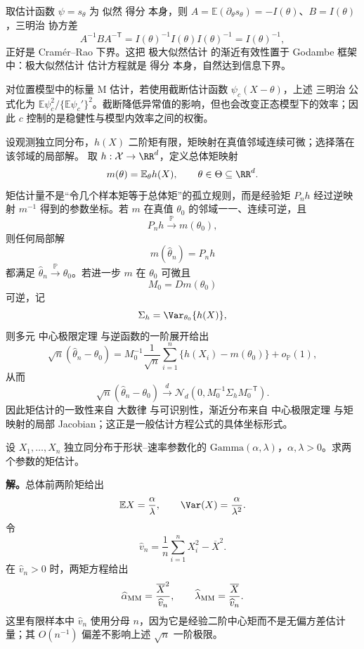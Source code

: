 取估计函数 $\psi=s_\theta$ 为 似然 得分 本身，则 $A=\mathbb E(\partial_\theta s_\theta)=-I(\theta)$、$B=I(\theta)$，三明治 协方差
\[
A^{-1}BA^{-\mathsf T}=I(\theta)^{-1}I(\theta)I(\theta)^{-1}=I(\theta)^{-1},
\]
正好是 Cramér--Rao 下界。这把 极大似然估计 的渐近有效性置于 Godambe 框架中：极大似然估计 估计方程就是 得分 本身，自然达到信息下界。


\begin{note}[截断估计函数的效率]
对位置模型中的标量 M 估计，若使用截断估计函数 $\psi_c(X-\theta)$，上述 三明治 公式化为 $\mathbb E\psi_c^2/\{\mathbb E\psi_c'\}^2$。截断降低异常值的影响，但也会改变正态模型下的效率；因此 $c$ 控制的是稳健性与模型内效率之间的权衡。
\end{note}

\begin{theorem}[矩映射的局部反演]
设观测独立同分布，$h(X)$ 二阶矩有限，矩映射在真值邻域连续可微；选择落在该邻域的局部解。
取 $h:\mathcal X\to\RR^d$，定义总体矩映射
\[
 m(\theta)=\mathbb E_\theta h(X),
 \qquad
 \theta\in\Theta\subseteq\RR^d.
\]
矩估计量不是“令几个样本矩等于总体矩”的孤立规则，而是经验矩 $P_nh$ 经过逆映射 $m^{-1}$ 得到的参数坐标。若 $m$ 在真值 $\theta_0$ 的邻域一一、连续可逆，且
\[
 P_nh\xrightarrow{\mathbb P} m(\theta_0),
\]
则任何局部解
\[
 m(\widehat\theta_n)=P_nh
\]
都满足 $\widehat\theta_n\xrightarrow{\mathbb P}\theta_0$。若进一步 $m$ 在 $\theta_0$ 可微且
\[
 M_0=Dm(\theta_0)
\]
可逆，记
\[
 \Sigma_h=\Var_{\theta_0}\{h(X)\},
\]
则多元 中心极限定理 与逆函数的一阶展开给出
\begin{equation}\label{eq:math-stat-moment-estimator-asymptotic}
 \sqrt n(\widehat\theta_n-\theta_0)
 =M_0^{-1}\frac1{\sqrt n}
 \sum_{i=1}^n\{h(X_i)-m(\theta_0)\}
 +o_{\mathbb P}(1),
\end{equation}
从而
\[
 \sqrt n(\widehat\theta_n-\theta_0)
 \xrightarrow{d}
 \mathcal N_d(0,M_0^{-1}\Sigma_hM_0^{-\mathsf T}).
\]
因此矩估计的一致性来自 大数律 与可识别性，渐近分布来自 中心极限定理 与矩映射的局部 Jacobian；这正是一般估计方程公式的具体坐标形式。
\end{theorem}

\begin{workedexample}
设 $X_1,\ldots,X_n$ 独立同分布于形状--速率参数化的 $\mathrm{Gamma}(\alpha,\lambda)$，$\alpha,\lambda>0$。求两个参数的矩估计。

\textbf{解。}总体前两阶矩给出
\[
 \mathbb E X=\frac{\alpha}{\lambda},
 \qquad
 \Var(X)=\frac{\alpha}{\lambda^2}.
\]
令
\[
 \widehat v_n
 =\frac1n\sum_{i=1}^nX_i^2-\overline X^2.
\]
在 $\widehat v_n>0$ 时，两矩方程给出
\begin{equation*}\widehat\alpha_{\rm MM}
 =\frac{\overline X^2}{\widehat v_n},
 \qquad
 \widehat\lambda_{\rm MM}
 =\frac{\overline X}{\widehat v_n}.
\end{equation*}
这里有限样本中 $\widehat v_n$ 使用分母 $n$，因为它是经验二阶中心矩而不是无偏方差估计量；其 $O(n^{-1})$ 偏差不影响上述 $\sqrt n$ 一阶极限。
\end{workedexample}

